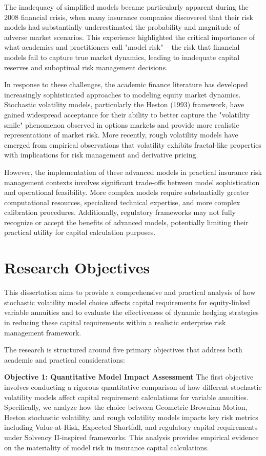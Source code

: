 \documentclass[12pt,a4paper]{report}
\begin{document}
The inadequacy of simplified models became particularly apparent during the 2008 financial crisis, when many insurance companies discovered that their risk models had substantially underestimated the probability and magnitude of adverse market scenarios. This experience highlighted the critical importance of what academics and practitioners call "model risk" – the risk that financial models fail to capture true market dynamics, leading to inadequate capital reserves and suboptimal risk management decisions.

In response to these challenges, the academic finance literature has developed increasingly sophisticated approaches to modeling equity market dynamics. Stochastic volatility models, particularly the Heston (1993) framework, have gained widespread acceptance for their ability to better capture the "volatility smile" phenomenon observed in options markets and provide more realistic representations of market risk. More recently, rough volatility models have emerged from empirical observations that volatility exhibits fractal-like properties with implications for risk management and derivative pricing.

However, the implementation of these advanced models in practical insurance risk management contexts involves significant trade-offs between model sophistication and operational feasibility. More complex models require substantially greater computational resources, specialized technical expertise, and more complex calibration procedures. Additionally, regulatory frameworks may not fully recognize or accept the benefits of advanced models, potentially limiting their practical utility for capital calculation purposes.

\section{Research Objectives}

This dissertation aims to provide a comprehensive and practical analysis of how stochastic volatility model choice affects capital requirements for equity-linked variable annuities and to evaluate the effectiveness of dynamic hedging strategies in reducing these capital requirements within a realistic enterprise risk management framework.

The research is structured around five primary objectives that address both academic and practical considerations:

\textbf{Objective 1: Quantitative Model Impact Assessment}
The first objective involves conducting a rigorous quantitative comparison of how different stochastic volatility models affect capital requirement calculations for variable annuities. Specifically, we analyze how the choice between Geometric Brownian Motion, Heston stochastic volatility, and rough volatility models impacts key risk metrics including Value-at-Risk, Expected Shortfall, and regulatory capital requirements under Solvency II-inspired frameworks. This analysis provides empirical evidence on the materiality of model risk in insurance capital calculations.
\end{document}
